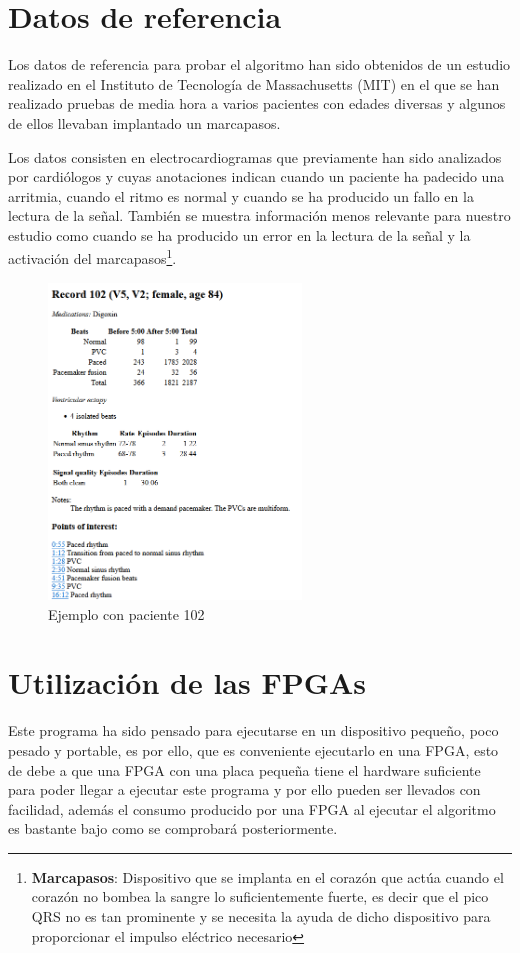 \section{Datos de referencia}
Los datos de referencia para probar el algoritmo han sido obtenidos de un estudio realizado en el Instituto de Tecnología de Massachusetts (MIT) \cite{MIT} en el que se han realizado pruebas de media hora a varios pacientes con edades diversas y algunos de ellos llevaban implantado un marcapasos.

Los datos consisten en electrocardiogramas que previamente han sido analizados por cardiólogos y cuyas anotaciones indican cuando un paciente ha padecido una arritmia, cuando el ritmo es normal y cuando se ha producido un fallo en la lectura de la señal. También se muestra información menos relevante para nuestro 
estudio como cuando se ha producido un error en la lectura de la señal y la activación del marcapasos\footnote{\textbf{Marcapasos}: Dispositivo que se implanta en el corazón que actúa cuando el corazón no bombea la sangre lo suficientemente fuerte, es decir que el pico QRS no es tan prominente
y se necesita la ayuda de dicho dispositivo para proporcionar el impulso eléctrico necesario}.

\begin{figure}[h]
	\centering
	\includegraphics[width=0.6\textwidth]{./Images/img_introduccion/Paciente_pruebas_MIT.png}
	\caption{Ejemplo con paciente 102 \cite{mitdb}}
	\label{fig:Paciente_pruebas_MIT}
\end{figure}

\section{Utilización de las FPGAs}
Este programa ha sido pensado para ejecutarse en un dispositivo pequeño, poco pesado y portable, es por ello, que es conveniente ejecutarlo en una FPGA, esto de debe a que una FPGA con una placa pequeña tiene el hardware suficiente para poder llegar a ejecutar este programa y por ello pueden
ser llevados con facilidad, además el consumo producido por una FPGA al ejecutar el algoritmo es bastante bajo como se comprobará posteriormente.

